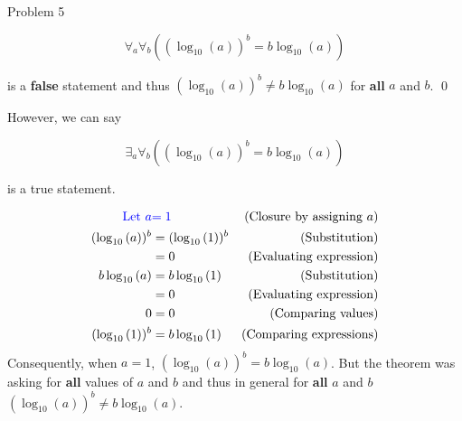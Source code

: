 \begin{problem}{Problem 5}
\begin{Highlight}[Solution]
        \begin{equation*}
            \forall_{a}\forall_{b}((\log_{10}{(a)})^{b} = b\log_{10}{(a)})
        \end{equation*}

        is a \textbf{false} statement and thus $(\log_{10}{(a)})^{b} \neq b\log_{10}{(a)}$ for \textbf{all} $a$ and $b$. \qed \vspace*{1em}


        However, we can say 

        \begin{equation*}
            \exists_{a}\forall_{b}((\log_{10}{(a)})^{b} = b\log_{10}{(a)})
        \end{equation*}

        is a true statement. \vspace*{1em}

        \begin{align*}
            \textcolor{blue}{\text{Let } a } & \textcolor{blue}{ = 1} & \text{(Closure by assigning $a$)} \\
            (\log_{10}{(a)})^{b} & = (\log_{10}{(1)})^{b} & \text{(Substitution)} \\
            & = 0 & \text{(Evaluating expression)} \\
            b\log_{10}{(a)} & = b\log_{10}{(1)} & \text{(Substitution)} \\
            & = 0 & \text{(Evaluating expression)} \\
            0 & = 0 & \text{(Comparing values)} \\
            (\log_{10}{(1)})^{b} & = b\log_{10}{(1)} & \text{(Comparing expressions)}
        \end{align*}
        Consequently, when $a = 1$, $(\log_{10}{(a)})^{b} = b\log_{10}{(a)}$. But the theorem was asking for \textbf{all} values of $a$ and $b$ and thus in general for \textbf{all} $a$ and $b$ 
        $(\log_{10}{(a)})^{b} \neq b\log_{10}{(a)}$.
    \end{Highlight}
\end{problem}

